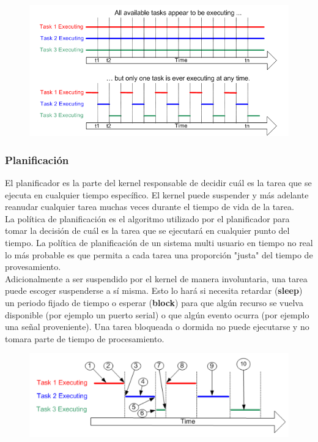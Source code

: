 \begin{figure}[H]
    \centering
    \includegraphics[scale=0.7]{RTOS/f1.PNG}
\end{figure}

\subsubsection{Planificación}

El planificador es la parte del kernel responsable de decidir cuál es la tarea que se ejecuta en cualquier tiempo específico. El kernel puede suspender y más adelante reanudar cualquier tarea muchas veces durante el tiempo de vida de la tarea.\\

La política de planificación es el algoritmo utilizado por el planificador para tomar la decisión de cuál es la tarea que se ejecutará en cualquier punto del tiempo. La política de planificación de un sistema multi usuario en tiempo no real lo más probable es que permita a cada tarea una proporción "justa" del tiempo de provesamiento. \\

Adicionalmente a ser suspendido por el kernel de manera involuntaria, una tarea puede escoger suspenderse a sí misma. Esto lo hará si necesita retardar (\textbf{sleep}) un periodo fijado de tiempo o esperar (\textbf{block}) para que algún recurso se vuelva disponible (por ejemplo un puerto serial) o que algún evento ocurra (por ejemplo una señal proveniente). Una tarea bloqueada o dormida no puede ejecutarse y no tomara parte de tiempo de procesamiento.  

\begin{figure}[H]
    \centering
    \includegraphics[scale=1]{RTOS/f2.PNG}
\end{figure}

